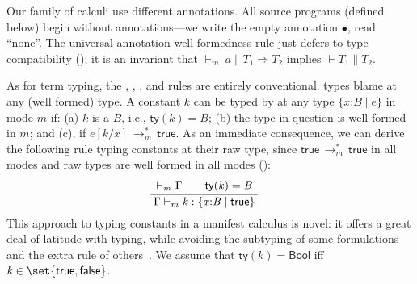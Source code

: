\documentclass[9pt]{extarticle}
\newcommand{\ottdrule}[4][]{{\displaystyle\frac{\begin{array}{l}#2\end{array}}{#3}\quad\ottdrulename{#4}}}
\newcommand{\ottnt}[1]{\mathit{#1}}
\newcommand{\ottsym}[1]{#1}
\newcommand{\ottdrulename}[1]{\textsc{#1}}
\begin{document}
Our family of calculi use different annotations. All source programs
(defined below) begin without annotations---we write the empty
annotation $ \bullet $, read ``none''. The universal annotation well formedness rule
just defers to type compatibility (); it is an invariant that
$ \mathord{  \vdash _{ \ottnt{m} } }~ \ottnt{a}   \mathrel{\parallel}   \ottnt{T_{{\mathrm{1}}}}  \Rightarrow  \ottnt{T_{{\mathrm{2}}}} $ implies $\vdash  \ottnt{T_{{\mathrm{1}}}}  \mathrel{\parallel}  \ottnt{T_{{\mathrm{2}}}}$.

As for term typing, the , , , and  rules
are entirely conventional.  types blame at any (well formed)
type. 
A constant $\ottnt{k}$ can be typed by  at any type $ \{ \mathit{x} \mathord{:} \ottnt{B} \mathrel{\mid} \ottnt{e} \} $
in mode $\ottnt{m}$ if: (a) $\ottnt{k}$ is a $\ottnt{B}$, i.e., $ \mathsf{ty} ( \ottnt{k} )   \ottsym{=}  \ottnt{B}$;
(b) the type in question is well formed in $\ottnt{m}$; and (c), if
$ \ottnt{e}  [  \ottnt{k} / \mathit{x}  ]  \,  \longrightarrow ^{*}_{ \ottnt{m} }  \,  \mathsf{true} $.
As an immediate consequence, we can derive the following rule typing
constants at their raw type, since $ \mathsf{true}  \,  \longrightarrow ^{*}_{ \ottnt{m} }  \,  \mathsf{true} $ in all modes
and raw types are well formed in all modes ():
\[ \ottdrule[]{ \mathord{  \vdash _{ \ottnt{m} } }~ \Gamma  \qquad  \mathsf{ty} ( \ottnt{k} )   \ottsym{=}  \ottnt{B}}{ \Gamma   \vdash _{ \ottnt{m} }  \ottnt{k}  :   \{ \mathit{x} \mathord{:} \ottnt{B} \mathrel{\mid}  \mathsf{true}  \}  }{}{} \]
This approach to typing constants in a manifest calculus is novel: it
offers a great deal of latitude with typing, while avoiding the
subtyping of some formulations~\cite{Greenberg12contracts,
  Flanagan06hybrid, Knowles10hybrid, Knowles06sage} and the extra rule
of others~\cite{Belo11fh}.
We assume that $ \mathsf{ty} ( \ottnt{k} )   \ottsym{=}   \mathsf{Bool} $ iff $\ottnt{k} \in \set{ \mathsf{true} ,
   \mathsf{false} }$.
\end{document}
